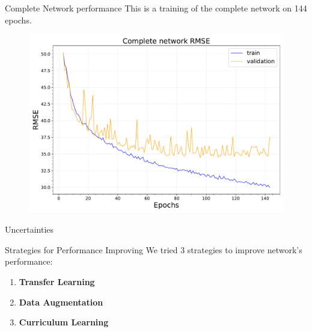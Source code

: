 \documentclass{beamer}
\begin{document}
\begin{frame}{Complete Network performance}
    This is a training of the complete network on 144 epochs.
    \begin{figure}
        \centering
        \includegraphics[width=.7\textwidth]{figures/long_run_rmse.pdf}
    \end{figure}
    
\end{frame}

\begin{frame}{Uncertainties}
    
\end{frame}



\begin{frame}{Strategies for Performance Improving}
    We tried 3 strategies to improve network's performance:
        \begin{enumerate}
            \item \textbf{Transfer Learning}
            \item \textbf{Data Augmentation}
            \item \textbf{Curriculum Learning}  
        \end{enumerate}

    
\end{frame}

\end{document}
